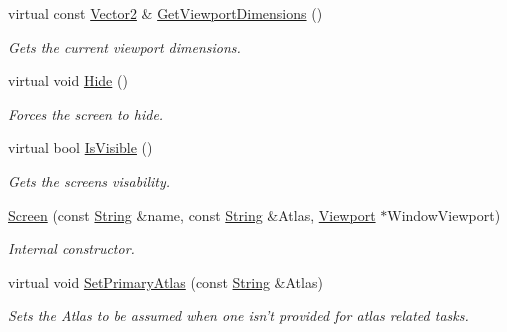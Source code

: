 \begin{DoxyCompactItemize}
virtual const \hyperlink{classMezzanine_1_1Vector2}{Vector2} \& \hyperlink{classMezzanine_1_1UI_1_1Screen_a12199967ad8a0e91cf816083aaa2a5d0}{GetViewportDimensions} ()
\begin{DoxyCompactList}\small\item\em Gets the current viewport dimensions. \item\end{DoxyCompactList}\item 
\hypertarget{classMezzanine_1_1UI_1_1Screen_aad220f00a62a75ab73e4620e853acdca}{
virtual void \hyperlink{classMezzanine_1_1UI_1_1Screen_aad220f00a62a75ab73e4620e853acdca}{Hide} ()}
\label{classMezzanine_1_1UI_1_1Screen_aad220f00a62a75ab73e4620e853acdca}

\begin{DoxyCompactList}\small\item\em Forces the screen to hide. \item\end{DoxyCompactList}\item 
virtual bool \hyperlink{classMezzanine_1_1UI_1_1Screen_abe4941cec0c43850bafa4b76397944ae}{IsVisible} ()
\begin{DoxyCompactList}\small\item\em Gets the screens visability. \item\end{DoxyCompactList}\item 
\hyperlink{classMezzanine_1_1UI_1_1Screen_aa39b4b7b96af6251c7304c266ecd85c9}{Screen} (const \hyperlink{namespaceMezzanine_acf9fcc130e6ebf08e3d8491aebcf1c86}{String} \&name, const \hyperlink{namespaceMezzanine_acf9fcc130e6ebf08e3d8491aebcf1c86}{String} \&Atlas, \hyperlink{classMezzanine_1_1Viewport}{Viewport} $\ast$WindowViewport)
\begin{DoxyCompactList}\small\item\em Internal constructor. \item\end{DoxyCompactList}\item 
virtual void \hyperlink{classMezzanine_1_1UI_1_1Screen_ae19e1d289996d93af69ff1ee500be2ad}{SetPrimaryAtlas} (const \hyperlink{namespaceMezzanine_acf9fcc130e6ebf08e3d8491aebcf1c86}{String} \&Atlas)
\begin{DoxyCompactList}\small\item\em Sets the Atlas to be assumed when one isn't provided for atlas related tasks. \item\end{DoxyCompactList}\item 

\end{DoxyCompactItemize}
